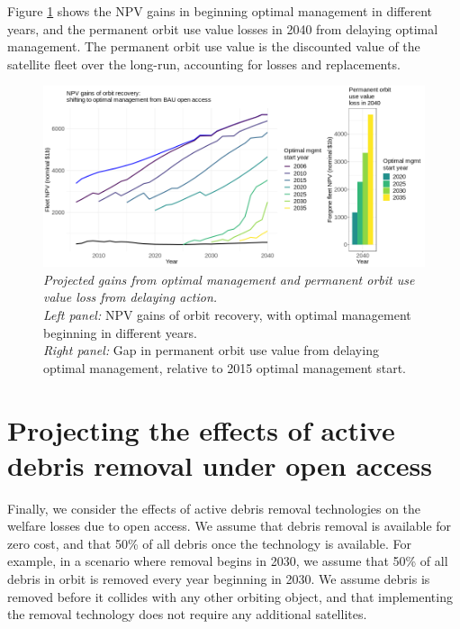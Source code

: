 \documentclass[12pt]{article}
\begin{document}
Figure \ref{costs_of_inaction} shows the NPV gains in beginning optimal management in different years, and the permanent orbit use value losses in 2040 from delaying optimal management. The permanent orbit use value is the discounted value of the satellite fleet over the long-run, accounting for losses and replacements.

\begin{figure}[H]
	\centering
	\includegraphics[width=\textwidth]{../../images/7_costs_of_inaction_2006_remfrac_0_remstart_2030.png}
	\captionsetup{format=hang}
	\caption[Permanent orbit use value loss from delaying action]{\textit{Projected gains from optimal management and permanent orbit use value loss from delaying action.} \\
		\textit{Left panel:} NPV gains of orbit recovery, with optimal management beginning in different years. \\
		\textit{Right panel:} Gap in permanent orbit use value from delaying optimal management, relative to 2015 optimal management start. \\
	}
	\label{costs_of_inaction}
\end{figure}

\section{Projecting the effects of active debris removal under open access}

Finally, we consider the effects of active debris removal technologies on the welfare losses due to open access. We assume that debris removal is available for zero cost, and that 50\% of all debris  once the technology is available. For example, in a scenario where removal begins in 2030, we assume that 50\% of all debris in orbit is removed every year beginning in 2030. We assume debris is removed before it collides with any other orbiting object, and that implementing the removal technology does not require any additional satellites. \\
\end{document}
